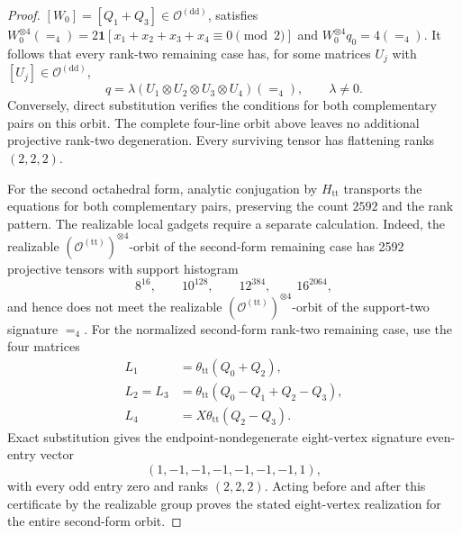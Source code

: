 \documentclass[11pt,letterpaper,onecolumn]{article}
\theoremstyle{plain}
\theoremstyle{definition}
\theoremstyle{remark}
\newcommand{\OctDD}{{\mathcal O^{(\mathrm{dd})}}}
\newcommand{\OctTT}{{\mathcal O^{(\mathrm{tt})}}}
\newcommand{\Eq}{=}
\newcommand{\one}{\mathbf 1}
\begin{document}
\begin{proof}
\([W_0]=[Q_1+Q_3]\in\OctDD\), satisfies
\(W_0^{\otimes4}(\Eq_4)=
2\one[x_1+x_2+x_3+x_4\equiv0\pmod2]\) and
\(W_0^{\otimes4}q_0=4(\Eq_4)\).  It follows that every
rank-two remaining case has, for some matrices \(U_j\) with
\([U_j]\in\OctDD\),
\begin{equation*}
  q=\lambda(U_1\otimes U_2\otimes U_3\otimes U_4)(\Eq_4),
  \qquad \lambda\ne0.
\end{equation*}
Conversely, direct substitution verifies the conditions for both
complementary pairs on this orbit. The complete four-line orbit above leaves no
additional projective rank-two degeneration. Every surviving tensor has
flattening ranks \((2,2,2)\).

For the second octahedral form, analytic conjugation by
\(H_{\mathrm{tt}}\) transports the equations for both complementary pairs,
preserving the count \(2592\) and the rank pattern. The realizable local
gadgets require a separate calculation. Indeed,
the realizable \((\OctTT)^{\otimes4}\)-orbit of the second-form remaining case
has 2592 projective tensors with support histogram
\begin{equation*}
  8^{16},\qquad10^{128},\qquad12^{384},\qquad16^{2064},
\end{equation*}
and hence does not meet the realizable \((\OctTT)^{\otimes4}\)-orbit of
the support-two signature \(\Eq_4\).  For the
normalized second-form rank-two remaining case, use the four matrices
\begin{equation}
\begin{aligned}
 L_1&=\theta_{\mathrm{tt}}(Q_0+Q_2),\\
 L_2=L_3&=\theta_{\mathrm{tt}}(Q_0-Q_1+Q_2-Q_3),\\
 L_4&=X\theta_{\mathrm{tt}}(Q_2-Q_3).
\end{aligned}
\label{eq:cert-platonic-q4-Oprime-dressing}
\end{equation}
Exact substitution gives the endpoint-nondegenerate eight-vertex signature
even-entry vector
\begin{equation}
  (1,-1,-1,-1,-1,-1,-1,1),
  \label{eq:p1-cert-q4-Oprime-eight-vertex-vector}
\end{equation}
with every odd entry zero and ranks \((2,2,2)\).  Acting before and after
this certificate by the realizable group proves the stated eight-vertex realization for the
entire second-form orbit.  


\end{proof}
\end{document}
